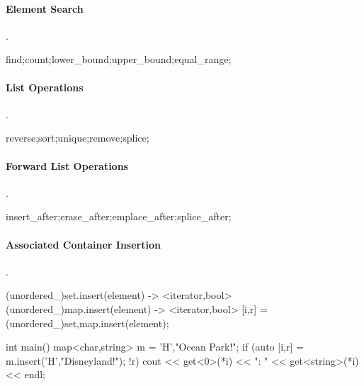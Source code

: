 \paragraph{Element Search}{.}
\begin{code}
find;count;lower_bound;upper_bound;equal_range;
\end{code}

\paragraph{List Operations}{.}
\begin{code}
reverse;sort;unique;remove;splice;
\end{code}

\paragraph{Forward List Operations}{.}
\begin{code}
insert_after;erase_after;emplace_after;splice_after;
\end{code}

\paragraph{Associated Container Insertion}{.}
\begin{code}
(unordered_)set.insert(element) -> <iterator,bool>
(unordered_)map.insert(element) -> <iterator,bool>
[i,r] = (unordered_){set,map}.insert(element);

int main()
{
  map<char,string> m = {{'H',"Ocean Park!"}};
  if (auto [i,r] = m.insert({'H',"Disneyland!"}); !r) {
    cout << get<0>(*i) << ": " << get<string>(*i) << endl;
  }
}

\end{code}


